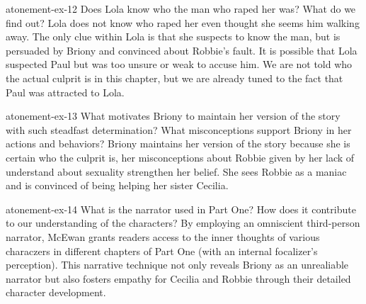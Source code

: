 \documentclass[preview]{standalone}
\begin{document}
\begin{snippetexercise}{atonement-ex-12}%
    {Does Lola know who the man who raped her was? What do we find out?}
    Lola does not know who raped her even thought she seems him walking away.
    The only clue within Lola is that she suspects to know the man, but is
    persuaded by Briony and convinced about Robbie's fault.
    It is possible that Lola suspected Paul but was too unsure or weak to accuse him.
    We are not told who the actual culprit is in this chapter,
    but we are already tuned to the fact that Paul was attracted to Lola.
\end{snippetexercise}

\begin{snippetexercise}{atonement-ex-13}%
    {What motivates Briony to maintain her version of the story with such steadfast determination?
    What misconceptions support Briony in her actions and behaviors?}
    Briony maintains her version of the story because she is certain who the culprit is,
    her misconceptions about Robbie given by her lack of understand about sexuality
    strengthen her belief.
    She sees Robbie as a maniac and is convinced of being helping her sister Cecilia.
\end{snippetexercise}

\begin{snippetexercise}{atonement-ex-14}{
    What is the narrator used in Part One? How does it contribute to our understanding of the
characters? }
    By employing an omniscient third-person narrator, McEwan grants readers
    access to the inner thoughts of various characzers in different chapters of Part One
    (with an internal focalizer's perception).
    This narrative technique not only reveals Briony as an unrealiable
    narrator but also fosters empathy for Cecilia and Robbie
    through their detailed character development.
\end{snippetexercise}
\end{document}

